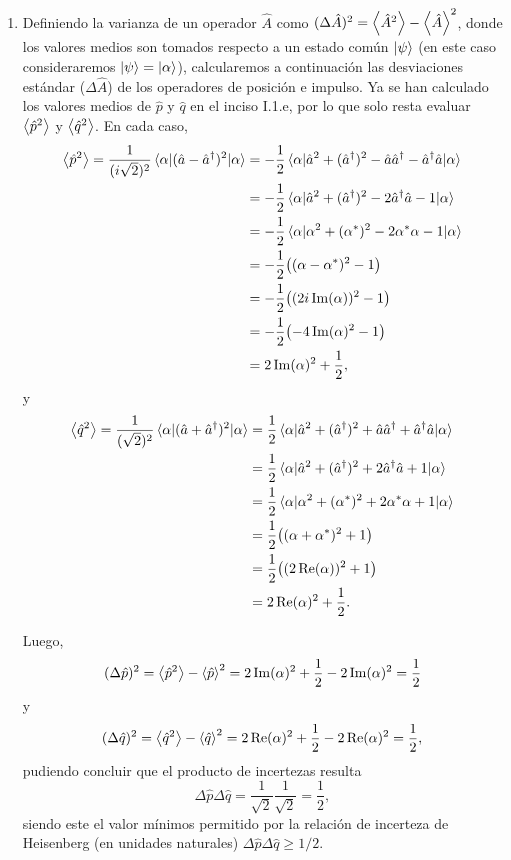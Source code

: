 \documentclass{scrartcl}
\newcommand{\inv}[1]{\frac{1}{#1}}
\renewcommand{\a}{\hat{a}}
\DeclareRobustCommand{\[}{\begin{equation}}
\DeclareRobustCommand{\]}{\end{equation}}
\begin{document}
\begin{enumerate}
\begin{enumerate}
        
        \item Definiendo la varianza de un operador $\hat A$ como $(\Delta \hat{A})^2 = \expval{\hat A^2} - \expval{\hat A}^2$, donde los valores medios son tomados respecto a un estado común $\ket{\psi}$ (en este caso consideraremos $\ket{\psi} = \ket{\alpha}$), calcularemos a continuación las desviaciones estándar ($\Delta \hat A$) de los operadores de posición e impulso. Ya se han calculado los valores medios de $\hat p$ y $\hat q$ en el inciso I.1.e, por lo que solo resta evaluar $\expval{\hat p^2}$ y $\expval{\hat q^2}$. En cada caso,
        \begin{align}
            \expval{\hat p^2} = \inv{(i \sqrt{2})^2} \mel{\alpha}{(\a - \a^\dagger)^2}{\alpha} &= -\inv{2} \mel{\alpha}{\a^2 + (\a^\dagger)^2 - \a \a^\dagger - \a^\dagger \a}{\alpha} \\
                &= -\inv{2} \mel{\alpha}{\a^2 + (\a^\dagger)^2 - 2 \a^\dagger \a - 1}{\alpha} \\
                &= -\inv{2} \mel{\alpha}{\alpha^2 + (\alpha^*)^2 - 2 \alpha^* \alpha - 1}{\alpha} \\
                &= -\inv{2} \qty((\alpha - \alpha^*)^2 - 1) \\
                &= -\inv{2} \qty((2 i \Im(\alpha))^2 - 1) \\
                &= -\inv{2} \qty(-4 \Im(\alpha)^2 - 1) \\
                &= 2 \Im(\alpha)^2 + \inv{2},
        \end{align}
        y
        \begin{align}
            \expval{\hat q^2} = \inv{(\sqrt{2})^2} \mel{\alpha}{(\a + \a^\dagger)^2}{\alpha} &= \inv{2} \mel{\alpha}{\a^2 + (\a^\dagger)^2 + \a \a^\dagger + \a^\dagger \a}{\alpha} \\
                &= \inv{2} \mel{\alpha}{\a^2 + (\a^\dagger)^2 + 2 \a^\dagger \a + 1}{\alpha} \\
                &= \inv{2} \mel{\alpha}{\alpha^2 + (\alpha^*)^2 + 2 \alpha^* \alpha + 1}{\alpha} \\
                &= \inv{2} \qty((\alpha + \alpha^*)^2 + 1) \\
                &= \inv{2} \qty((2 \Re(\alpha))^2 + 1) \\
                &= 2 \Re(\alpha)^2 + \inv{2}.
        \end{align}
        
        Luego,
        \[ (\Delta \hat p)^2 = \expval{\hat p^2} - \expval{\hat p}^2 = 2 \Im(\alpha)^2 + \inv{2} - 2 \Im(\alpha)^2 = \inv{2} \]
        y
        \[ (\Delta \hat q)^2 = \expval{\hat q^2} - \expval{\hat q}^2 = 2 \Re(\alpha)^2 + \inv{2} - 2 \Re(\alpha)^2 = \inv{2}, \]
        pudiendo concluir que el producto de incertezas resulta
        \[ \Delta \hat p \Delta \hat q = \inv{\sqrt{2}} \inv{\sqrt{2}} = \inv{2}, \]
        siendo este el valor mínimos permitido por la relación de incerteza de Heisenberg (en unidades naturales) $\Delta \hat p \Delta \hat q \geq 1/2$.
        

\end{enumerate}
\end{enumerate}
\end{document}
